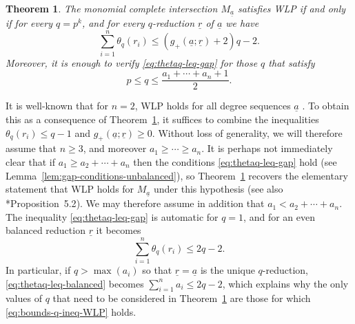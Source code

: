 \documentclass[11pt,reqno]{amsart}
\newcommand{\ul}[1]{\underline{#1}}
\newtheorem{theorem}{Theorem}[section]
\theoremstyle{definition}
\theoremstyle{remark}
\numberwithin{equation}{section}
\begin{document}
\begin{theorem}\label{thm:new-WLP}
    The monomial complete intersection $M_{\ul{a}}$ satisfies WLP if and only if for every $q=p^k$, and for every $q$-reduction $\ul{r}$ of $\ul{a}$ we have
    \begin{equation}\label{eq:thetaq-leq-gap}
    \sum_{i=1}^n\theta_q(r_i)\leq \left(g_+(\ul{a};\ul{r})+2\right)q-2.
    \end{equation}
    Moreover, it is enough to verify \eqref{eq:thetaq-leq-gap} for those $q$ that satisfy
\begin{equation}\label{eq:bounds-q-ineq-WLP}
p \leq q \leq \frac{a_1+\cdots+a_n+1}{2}.
\end{equation} 
\end{theorem}

It is well-known that for $n=2$, WLP holds for all degree sequences $\ul{a}$ \cites{HMNW,MZ}. To obtain this as a consequence of Theorem~\ref{thm:new-WLP}, it suffices to combine the inequalities $\theta_q(r_i)\leq q-1$ and $g_+(\ul{a};\ul{r})\geq 0$. Without loss of generality, we will therefore assume that $n\geq 3$, and moreover $a_1\geq\cdots\geq a_n$. It is perhaps not immediately clear that if $a_1\geq a_2+\cdots+a_n$ then the conditions \eqref{eq:thetaq-leq-gap} hold (see Lemma~\ref{lem:gap-conditions-unbalanced}), so Theorem~\ref{thm:new-WLP} recovers the elementary statement that WLP holds for $M_{\ul{a}}$ under this hypothesis (see also \cite{mig-mr}*{Proposition~5.2}). We may therefore assume in addition that $a_1<a_2+\cdots+a_n$. The inequality \eqref{eq:thetaq-leq-gap} is automatic for $q=1$, and for an even balanced reduction $\ul{r}$ it becomes
\begin{equation}\label{eq:thetaq-leq-balanced}
\sum_{i=1}^n\theta_q(r_i)\leq 2q-2.
\end{equation}
In particular, if $q>\max(a_i)$ so that $\ul{r}=\ul{a}$ is the unique $q$-reduction, \eqref{eq:thetaq-leq-balanced} becomes $\sum_{i=1}^n a_i \leq 2q-2$, which explains why the only values of $q$ that need to be considered in Theorem~\ref{thm:new-WLP} are those for which \eqref{eq:bounds-q-ineq-WLP} holds.
\end{document}

